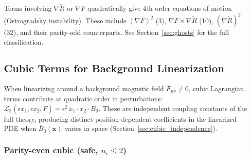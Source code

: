 \documentclass[12pt,a4paper]{article}
\newcommand{\Rt}{\tilde{R}}         %
\newcommand{\del}{\nabla}            %
\begin{document}
Terms involving $\del\Rt$ or $\del F$ quadratically give
4th-order equations of motion (Ostrogradsky instability). These
include $(\del F)^2$ (3), $\del F \times \del\Rt$ (10),
$(\del\Rt)^2$ (32), and their parity-odd counterparts.
See Section~\ref{sec:ghosts} for the full classification.


\subsection{Cubic Terms for Background Linearization}
\label{sec:cubic}

When linearizing around a background magnetic field
$\bar{F}_{\mu\nu} \neq 0$, cubic Lagrangian terms contribute at
quadratic order in perturbations:
$\mathcal{L}_3(\epsilon x_1, \epsilon x_2, \bar{F})
= \epsilon^2\, x_1 \cdot x_2 \cdot \bar{B}_0$.
These are independent coupling constants of the full theory,
producing distinct position-dependent coefficients in the linearized
PDE when $\bar{B}_0(\mathbf{x})$ varies in space
(Section~\ref{sec:cubic_independence}).

\subsubsection{Parity-even cubic (safe, $n_\epsilon \leq 2$)}
\end{document}
